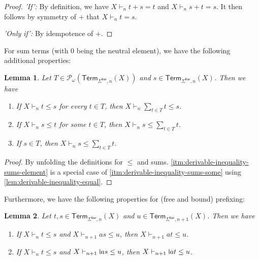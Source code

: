\documentclass[11pt,a4paper]{amsart}
\newtheorem{lemma}[lemma]{Lemma}
\newcommand{\Br}{\mathsf{bar}}
\newcommand{\Term}{\mathsf{Term}}
\newcommand{\pow}{\mathcal{P}}
\newcommand{\powf}{\pow_{\omega}}
\theoremstyle{plain}
\newcommand{\midmid}{\hspace{0.2ex}{\rule[-0.1ex]{0.6pt}{1.65ex}}\hspace{0.2ex}}
\newcommand{\newletter}[1]{{\midmid}#1}
\numberwithin{equation}{section}
\newcommand{\+}[1]{\mathcal{#1}\xspace}
\theoremstyle{definition}
\begin{document}
\begin{proof}
  \emph{'If':}
  By definition, we have \(X \vdash_n t + s = t\) and \(X \vdash_n s + t = s\).
  It then follows by symmetry of \(+\) that \(X \vdash_n t = s\).

  \noindent\emph{'Only if':}
  By idempotence of \(+\).

\end{proof}

For sum terms (with \(0\) being the neutral element), we have the following additional properties:

\begin{lemma}\label{lem:derivable-inequality-sums}
  Let \(T \in \powf(\Term_{\Sigma^\Br, n}(X))\) and \(s \in \Term_{\Sigma^\Br, n}(X)\). Then we have
  \begin{enumerate}
    \item\label{itm:derivable-inequality-sums-all}
      If \(X \vdash_n t \le s\) for every \(t \in T\), then \(X \vdash_n \sum_{t \in T} t \le s\).
    \item\label{itm:derivable-inequality-sums-some}
      If \(X \vdash_n s \le t\) for some \(t \in T\), then \(X \vdash_n s \le \sum_{t \in T} t\).
    \item\label{itm:derivable-inequality-sums-element}
      If \(s \in T\), then \(X \vdash_n s \le \sum_{t \in T} t\).
  \end{enumerate}
\end{lemma}

\begin{proof}
  By unfolding the definitions for \(\le\) and sums. \eqref{itm:derivable-inequality-sums-element} is a special case of \eqref{itm:derivable-inequality-sums-some} using \cref{lem:derivable-inequality-equal}.
\end{proof}

Furthermore, we have the following properties for (free and bound) prefixing:

\begin{lemma}\label{lem:derivable-inequality-prefix}
  Let \(t, s \in \Term_{\Sigma^\Br, n}(X)\) and \(u \in \Term_{\Sigma^\Br, n + 1}(X)\). Then we have
  \begin{enumerate}
    \item If \(X \vdash_n t \le s\) and \(X \vdash_{n + 1} as \le u\), then \(X \vdash_{n + 1} at \le u\).
    \item If \(X \vdash_n t \le s\) and \(X \vdash_{n + 1} \newletter{a}s \le u\), then \(X \vdash_{n + 1} \newletter{a}t \le u\).
  \end{enumerate}
\end{lemma}
\end{document}
